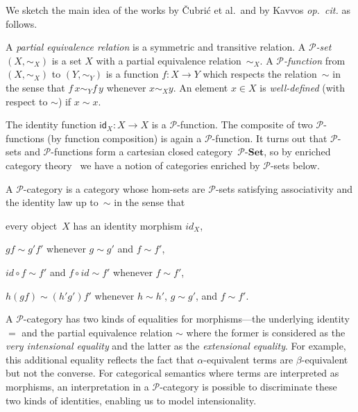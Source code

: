\documentclass[a4paper,UKenglish,numberwithinsect,cleveref,thm-restate]{lipics-v2021}
\numberwithin{equation}{section}
\newcommand{\PP}{\mathscr{P}}
\newcommand{\id}{\mathsf{id}}
\newcommand{\iid}{\mathit{id}}
\theoremstyle{plain}
\begin{document}
We sketch the main idea of the works by \v{C}ubri\'c et al.\ and by Kavvos \emph{op.\ cit.} as follows.
\begin{definition}
  A \emph{partial equivalence relation} is a symmetric and transitive relation.
  A \emph{$\PP$-set} $(X, \sim_X)$ is a set $X$ with a partial equivalence relation~$\sim_X$.
  A \emph{$\PP$-function} from $(X, \sim_X)$ to $(Y, \sim_Y)$ is a function $f\colon X \to Y$ which respects the relation~$\sim$ in the sense that $f\,x \sim_Y f\,y$ whenever $x \sim_X y$.
  An element $x \in X$ is \emph{well-defined} (with respect to $\sim$) if $x \sim x$.
\end{definition}
The identity function $\id_X : X \to X$ is a $\PP$-function.
The composite of two $\PP$-functions (by function composition) is again a $\PP$-function.
It turns out that $\PP$-sets and $\PP$-functions form a cartesian closed category~$\PP\text{-}\mathbf{Set}$, so by enriched category theory~\cite{Kelly1982} we have a notion of categories enriched by $\PP$-sets below.

\begin{definition}
  A $\PP$-category is a category whose hom-sets are $\PP$-sets satisfying associativity and the identity law up to~$\sim$ in the sense that 
  \begin{romanenumerate}
  \item every object~$X$ has an identity morphism $\iid_X$, 
  \item $g f \sim g' f'$ whenever $g\sim g'$ and $f \sim f'$,
  \item $\iid \circ f \sim f'$ and $f \circ \iid \sim f'$ whenever $f \sim f'$,
  \item $h(gf) \sim (h'g')f'$ whenever $h\sim h'$, $g \sim g'$, and $f \sim f'$.
  \end{romanenumerate}
\end{definition}

A $\PP$-category has two kinds of equalities for morphisms---the underlying identity $=$ and the partial equivalence relation $\sim$ where the former is considered as the \emph{very intensional equality} and the latter as the \emph{extensional equality}. 
For example, this additional equality reflects the fact that $\alpha$-equivalent terms are $\beta$-equivalent but not the converse.
For categorical semantics where terms are interpreted as morphisms, an interpretation in a $\PP$-category is possible to discriminate these two kinds of identities, enabling us to model intensionality.
\end{document}
